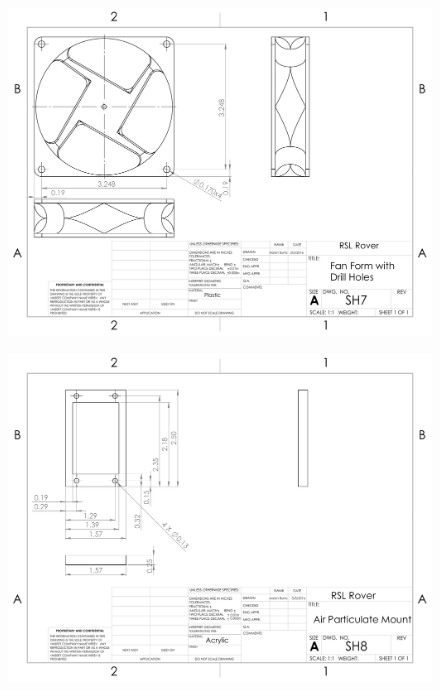 \begin{figure}[H]
	\centerline{\includegraphics[angle=90,width=1.0\linewidth]{dwgs/SH7.pdf}}
\end{figure}

\begin{figure}[H]
	\centerline{\includegraphics[angle=90,width=1.0\linewidth]{dwgs/SH8.pdf}}
\end{figure}

